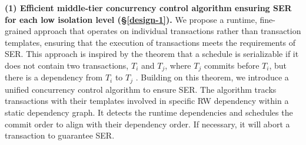 \textbf{(1) Efficient middle-tier concurrency control algorithm ensuring SER for each low isolation level (\S\ref{design-1}).} 
We propose a runtime, fine-grained approach that operates on individual transactions rather than transaction templates, ensuring that the execution of transactions meets the requirements of SER. This approach is inspired by the theorem that a schedule is serializable if it does not contain two transactions, $T_i$ and $T_j$, where $T_j$ commits before $T_i$, but there is a dependency from $T_i$ to $T_j$ \cite{DBLP:conf/aiccsa/AlomariF15}.
Building on this theorem, we introduce a unified concurrency control algorithm to ensure SER. 
The algorithm tracks transactions with their templates involved in specific RW dependency within a static dependency graph. 
It detects the runtime dependencies and schedules the commit order to align with their dependency order. If necessary, it will abort a transaction to guarantee SER.
